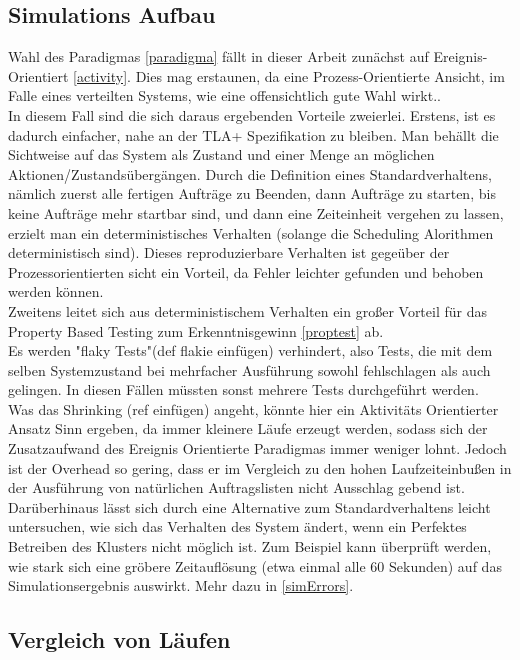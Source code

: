 \subsection{Simulations Aufbau}
Wahl des Paradigmas \ref{paradigma} fällt in dieser Arbeit zunächst auf Ereignis-Orientiert \ref{activity}. Dies mag erstaunen, da eine Prozess-Orientierte Ansicht, im Falle eines verteilten Systems, wie eine offensichtlich gute Wahl wirkt..\\
In diesem Fall sind die sich daraus ergebenden Vorteile zweierlei. Erstens, ist es dadurch einfacher, nahe an der TLA+ Spezifikation zu bleiben. Man behällt die Sichtweise auf das System als Zustand und einer Menge an möglichen Aktionen/Zustandsübergängen. Durch die Definition eines Standardverhaltens, nämlich zuerst alle fertigen Aufträge zu Beenden, dann Aufträge zu starten, bis keine Aufträge mehr startbar sind, und dann eine Zeiteinheit vergehen zu lassen, erzielt man ein deterministisches Verhalten (solange die Scheduling Alorithmen deterministisch sind). Dieses reproduzierbare Verhalten ist gegeüber der Prozessorientierten sicht ein Vorteil, da Fehler leichter gefunden und behoben werden können.\\
Zweitens leitet sich aus deterministischem Verhalten ein großer Vorteil für das Property Based Testing zum Erkenntnisgewinn \ref{proptest} ab.\\
Es werden "flaky Tests"(def flakie einfügen) verhindert, also Tests, die mit dem selben Systemzustand bei mehrfacher Ausführung sowohl fehlschlagen als auch gelingen. In diesen Fällen müssten sonst mehrere Tests durchgeführt werden.\\
Was das Shrinking (ref einfügen) angeht, könnte hier ein  Aktivitäts Orientierter Ansatz Sinn ergeben, da immer kleinere Läufe erzeugt werden, sodass sich der Zusatzaufwand des Ereignis Orientierte Paradigmas immer weniger lohnt. Jedoch ist der Overhead so gering, dass er im Vergleich zu den hohen Laufzeiteinbußen in der Ausführung von natürlichen Auftragslisten nicht Ausschlag gebend ist.\\
Darüberhinaus lässt sich durch eine Alternative zum Standardverhaltens leicht untersuchen, wie sich das Verhalten des System ändert, wenn ein Perfektes Betreiben des Klusters nicht möglich ist. Zum Beispiel kann überprüft werden, wie stark sich eine gröbere Zeitauflösung (etwa einmal alle 60 Sekunden) auf das Simulationsergebnis auswirkt. Mehr dazu in \ref{simErrors}.


\subsection{Vergleich von Läufen}
